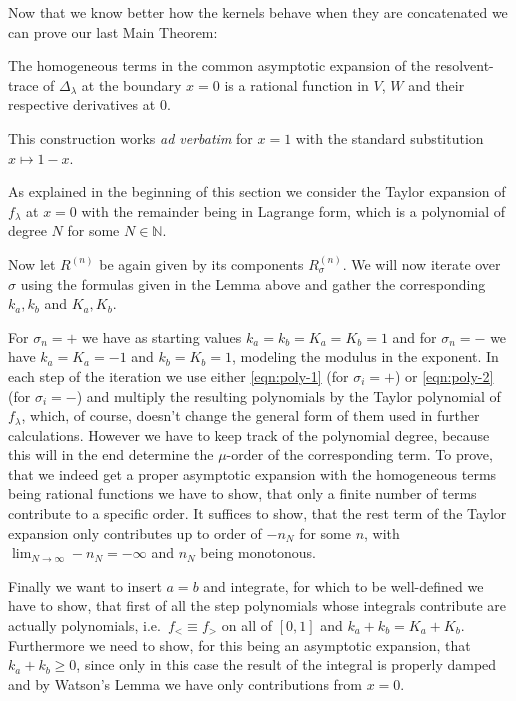 Now that we know better how the kernels behave when they are concatenated we can
prove our last Main Theorem:
\begin{MainTheorem}
  The homogeneous terms in the  common asymptotic expansion of the
  resolvent-trace of $\Delta_\lambda$ at the boundary $x = 0$ is a rational
  function in $V$, $W$ and their respective derivatives at $0$.
  \begin{Remark}
    This construction works \emph{ad verbatim} for $x=1$ with the standard
    substitution $x\mapsto 1 - x$.
  \end{Remark}
  \begin{Proof}
    As explained in the beginning of this section we consider the Taylor
    expansion of $f_\lambda$ at $x=0$ with the remainder being in Lagrange form,
    which is a polynomial of degree $N$ for some $N\in\mathbb{N}$.

    Now let $R^{(n)}$ be again given by its components $R^{(n)}_{\sigma}$. We
    will now iterate over $\sigma$ using the formulas given in the Lemma above
    and gather the corresponding $k_a,k_b$ and $K_a,K_b$.

    For $\sigma_{n} = +$ we have as starting values $k_a = k_b = K_a = K_b = 1$
    and for $\sigma_{n} = -$ we have $k_a = K_a = -1$ and $k_b = K_b = 1$,
    modeling the modulus in the exponent. In each step of the iteration we use
    either \eqref{eqn:poly-1} (for $\sigma_i = +$) or \eqref{eqn:poly-2} (for
    $\sigma_i = -$) and multiply the resulting polynomials by the
    Taylor polynomial of $f_{\lambda}$, which, of course, doesn't change the
    general form of them used in further calculations. However we have to keep
    track of the polynomial degree, because this will in the end determine the
    $\mu$-order of the corresponding term. To prove, that we indeed get a proper
    asymptotic expansion with the homogeneous terms being rational functions we
    have to show, that only a finite number of terms contribute to a specific
    order. It suffices to show, that the rest term of the Taylor expansion only
    contributes up to order of $-n_N$ for some $n$, with $\lim_{N\to\infty}
    -n_N = -\infty$ and $n_N$ being monotonous.

    Finally we want to insert $a = b$ and integrate, for which to be
    well-defined we have to show, that first of all the step polynomials whose
    integrals contribute are actually polynomials, i.e.\ $f_< \equiv f_>$ on all
    of $[0,1]$ and $k_a + k_b = K_a + K_b$. Furthermore we need to show, for
    this being an asymptotic expansion, that $k_a + k_b \geq 0$, since only in
    this case the result of the integral is properly damped and by Watson's
    Lemma we have only contributions from $x = 0$.


\end{Proof}
\end{MainTheorem}
